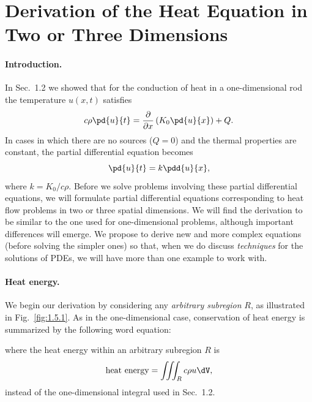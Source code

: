 
\section{Derivation of the Heat Equation in Two or Three Dimensions}
\label{sec:1.5}

\paragraph{Introduction.}
In Sec.~1.2 we showed that for the conduction of heat in a one-dimensional rod the temperature $u(x,t)$ satisfies
\[
c\rho\pd{u}{t} = \frac{\partial}{\partial x}\left(K_0\pd{u}{x}\right) + Q.
\]
In cases in which there are no sources ($Q = 0$) and the thermal properties are constant, the partial differential equation becomes
\[
\pd{u}{t} = k\pdd{u}{x},
\]
where $k = K_0/c\rho$. Before we solve problems involving these partial differential equations, we will formulate partial differential equations corresponding to heat flow problems in two or three spatial dimensions. We will find the derivation to be similar to the one used for one-dimensional problems, although important differences will emerge. We propose to derive new and more complex equations (before solving the simpler ones) so that, when we do discuss \emph{techniques} for the solutions of PDEs, we will have more than one example to work with.

\paragraph{Heat energy.}
We begin our derivation by considering any \emph{arbitrary subregion} $R$, as illustrated in Fig.~\ref{fig:1.5.1}. As in the one-dimensional case, conservation of heat energy is summarized by the following word equation:

\begin{center}
\end{center}

\noindent where the heat energy within an arbitrary subregion $R$ is
\[
\text{heat energy} = \iiint_R c\rho u\dV,
\]
instead of the one-dimensional integral used in Sec.~1.2.

